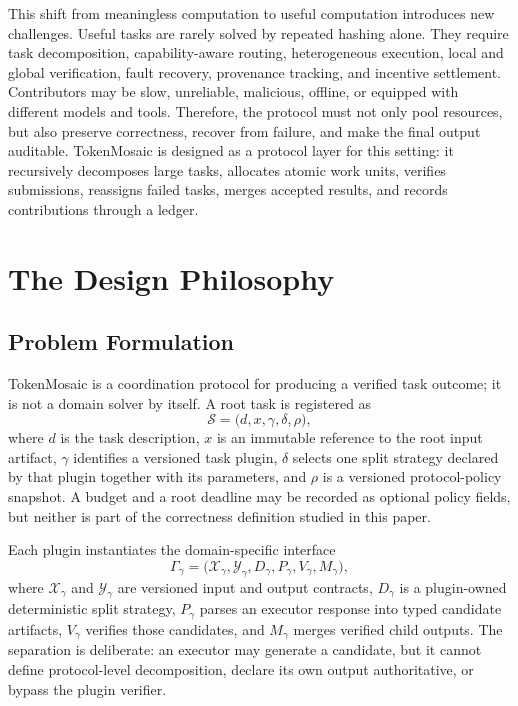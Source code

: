 \documentclass{article}
\theoremstyle{plain}
\begin{document}
This shift from meaningless computation to useful computation introduces new challenges. Useful tasks are rarely solved by repeated hashing alone. They require task decomposition, capability-aware routing, heterogeneous execution, local and global verification, fault recovery, provenance tracking, and incentive settlement. Contributors may be slow, unreliable, malicious, offline, or equipped with different models and tools. Therefore, the protocol must not only pool resources, but also preserve correctness, recover from failure, and make the final output auditable. TokenMosaic is designed as a protocol layer for this setting: it recursively decomposes large tasks, allocates atomic work units, verifies submissions, reassigns failed tasks, merges accepted results, and records contributions through a ledger.






\section{The Design Philosophy}
\label{sec:design}

\subsection{Problem Formulation}
\label{sec:problem-formulation}

TokenMosaic is a coordination protocol for producing a verified task outcome; it is not a domain solver by itself. A root task is registered as
\begin{equation}
    \mathcal{S}
    =
    \bigl(d, x, \gamma, \delta, \rho\bigr),
\end{equation}
where $d$ is the task description, $x$ is an immutable reference to the root input artifact, $\gamma$ identifies a versioned task plugin, $\delta$ selects one split strategy declared by that plugin together with its parameters, and $\rho$ is a versioned protocol-policy snapshot. A budget and a root deadline may be recorded as optional policy fields, but neither is part of the correctness definition studied in this paper.

Each plugin instantiates the domain-specific interface
\begin{equation}
    \Gamma_{\gamma}
    =
    \bigl(\mathcal{X}_{\gamma}, \mathcal{Y}_{\gamma}, D_{\gamma}, P_{\gamma}, V_{\gamma}, M_{\gamma}\bigr),
\end{equation}
where $\mathcal{X}_{\gamma}$ and $\mathcal{Y}_{\gamma}$ are versioned input and output contracts, $D_{\gamma}$ is a plugin-owned deterministic split strategy, $P_{\gamma}$ parses an executor response into typed candidate artifacts, $V_{\gamma}$ verifies those candidates, and $M_{\gamma}$ merges verified child outputs. The separation is deliberate: an executor may generate a candidate, but it cannot define protocol-level decomposition, declare its own output authoritative, or bypass the plugin verifier.
\end{document}

